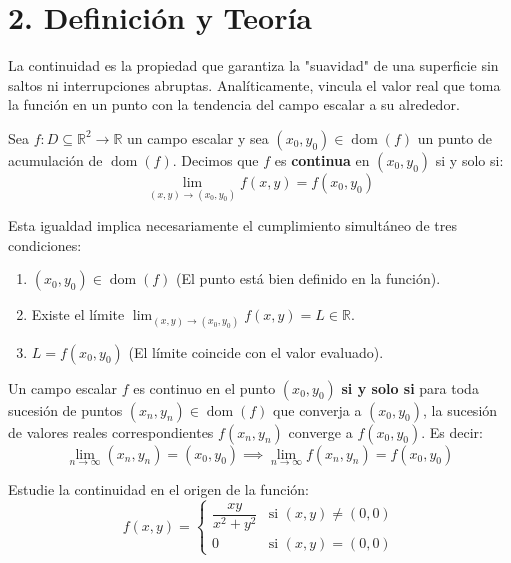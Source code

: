 \documentclass[11pt]{article}
\newenvironment{teoria}{%
  \section*{2. Definición y Teoría}%
}{}
\newenvironment{definicion}[1]{%
  \begin{tcolorbox}[colback=blue!5,colframe=blue!75!black,title=Definición: #1]%
}{%
  \end{tcolorbox}%
}
\newenvironment{teorema}[1]{%
  \begin{tcolorbox}[colback=green!5,colframe=green!75!black,title=Teorema: #1]%
}{%
  \end{tcolorbox}%
}
\newenvironment{ejemplo}[1]{%
  \begin{tcolorbox}[colback=white,colframe=gray!40,title=Ejemplo: #1]%
}{%
  \end{tcolorbox}%
}
\begin{document}
\begin{teoria}
  La continuidad es la propiedad que garantiza la "suavidad" de una superficie sin saltos ni interrupciones abruptas. Analíticamente, vincula el valor real que toma la función en un punto con la tendencia del campo escalar a su alrededor.

  \begin{definicion}{Continuidad de un Campo Escalar en un Punto}
    Sea $f \colon D \subseteq \mathbb{R}^2 \to \mathbb{R}$ un campo escalar y sea $(x_0, y_0) \in \operatorname{dom}(f)$ un punto de acumulación de $\operatorname{dom}(f)$. Decimos que $f$ es \textbf{continua} en $(x_0, y_0)$ si y solo si:
    $$ \lim_{(x,y) \to (x_0, y_0)} f(x,y) = f(x_0, y_0) $$
    
    Esta igualdad implica necesariamente el cumplimiento simultáneo de tres condiciones:
    \begin{enumerate}
      \item $(x_0, y_0) \in \operatorname{dom}(f)$ (El punto está bien definido en la función).
      \item Existe el límite $\displaystyle \lim_{(x,y) \to (x_0, y_0)} f(x,y) = L \in \mathbb{R}$.
      \item $L = f(x_0, y_0)$ (El límite coincide con el valor evaluado).
    \end{enumerate}
  \end{definicion}

  \begin{teorema}{Caracterización Secuencial de la Continuidad}
    Un campo escalar $f$ es continuo en el punto $(x_0, y_0)$ \textbf{si y solo si} para toda sucesión de puntos $(x_n, y_n) \in \operatorname{dom}(f)$ que converja a $(x_0, y_0)$, la sucesión de valores reales correspondientes $f(x_n, y_n)$ converge a $f(x_0, y_0)$. Es decir:
    $$ \lim_{n \to \infty} (x_n, y_n) = (x_0, y_0) \implies \lim_{n \to \infty} f(x_n, y_n) = f(x_0, y_0) $$
  \end{teorema}

  \begin{ejemplo}{Uso de Sucesiones para Descartar Continuidad}
    Estudie la continuidad en el origen de la función:
    $$ f(x,y) = \begin{cases} \dfrac{xy}{x^2+y^2} & \text{si } (x,y) \neq (0,0) \\[0.5em] 0 & \text{si } (x,y) = (0,0) \end{cases} $$
    

\end{ejemplo}
\end{teoria}
\end{document}
